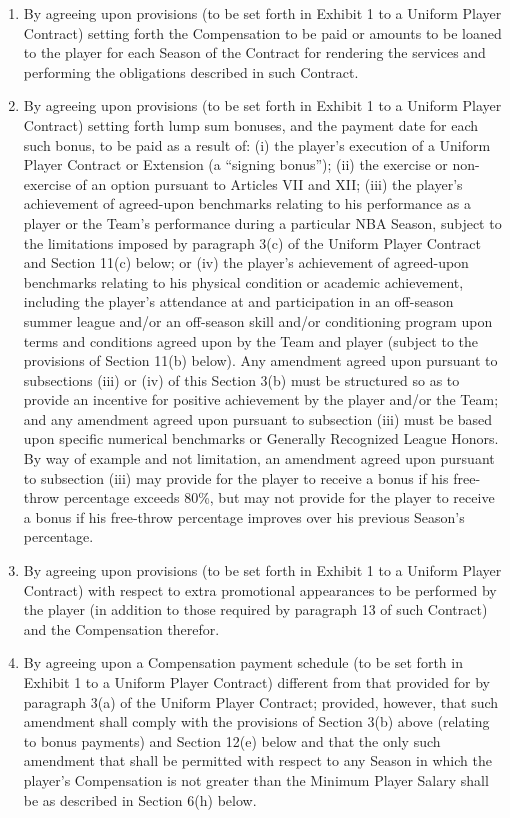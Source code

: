 \documentclass[
]{book}
\providecommand{\tightlist}{%
  \setlength{\itemsep}{0pt}\setlength{\parskip}{0pt}}
\begin{document}
\begin{enumerate}
\def\labelenumi{(\alph{enumi})}
\tightlist
\item
  By agreeing upon provisions (to be set forth in Exhibit 1 to a Uniform Player Contract) setting forth the Compensation to be paid or amounts to be loaned to the player for each Season of the Contract for rendering the services and performing the obligations described in such Contract.
\item
  By agreeing upon provisions (to be set forth in Exhibit 1 to a Uniform Player Contract) setting forth lump sum bonuses, and the payment date for each such bonus, to be paid as a result of: (i) the player's execution of a Uniform Player Contract or Extension (a ``signing bonus''); (ii) the exercise or non-exercise of an option pursuant to Articles VII and XII; (iii) the player's achievement of agreed-upon benchmarks relating to his performance as a player or the Team's performance during a particular NBA Season, subject to the limitations imposed by paragraph 3(c) of the Uniform Player Contract and Section 11(c) below; or (iv) the player's achievement of agreed-upon benchmarks relating to his physical condition or academic achievement, including the player's attendance at and participation in an off-season summer league and/or an off-season skill and/or conditioning program upon terms and conditions agreed upon by the Team and player (subject to the provisions of Section 11(b) below). Any amendment agreed upon pursuant to subsections (iii) or (iv) of this Section 3(b) must be structured so as to provide an incentive for positive achievement by the player and/or the Team; and any amendment agreed upon pursuant to subsection (iii) must be based upon specific numerical benchmarks or Generally Recognized League Honors. By way of example and not limitation, an amendment agreed upon pursuant to subsection (iii) may provide for the player to receive a bonus if his free-throw percentage exceeds 80\%, but may not provide for the player to receive a bonus if his free-throw percentage improves over his previous Season's percentage.
\item
  By agreeing upon provisions (to be set forth in Exhibit 1 to a Uniform Player Contract) with respect to extra promotional appearances to be performed by the player (in addition to those required by paragraph 13 of such Contract) and the Compensation therefor.
\item
  By agreeing upon a Compensation payment schedule (to be set forth in Exhibit 1 to a Uniform Player Contract) different from that provided for by paragraph 3(a) of the Uniform Player Contract; provided, however, that such amendment shall comply with the provisions of Section 3(b) above (relating to bonus payments) and Section 12(e) below and that the only such amendment that shall be permitted with respect to any Season in which the player's Compensation is not greater than the Minimum Player Salary shall be as described in Section 6(h) below.

\end{enumerate}
\end{document}
